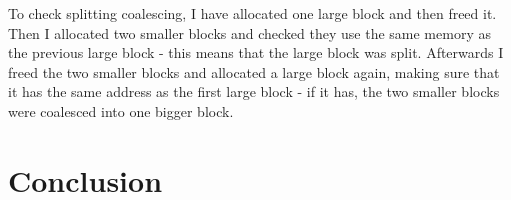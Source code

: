 \documentclass{article}
\begin{document}
To check splitting coalescing, I have allocated one large block and then freed it. Then I allocated two smaller blocks and checked they use the same memory as the previous large block - this means that the large block was split. Afterwards I freed the two smaller blocks and allocated a large block again, making sure that it has the same address as the first large block - if it has, the two smaller blocks were coalesced into one bigger block.

\section{Conclusion}



\end{document}

